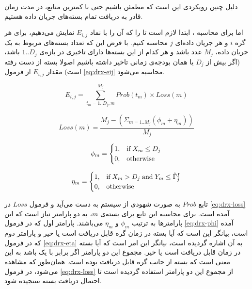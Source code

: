 \par
دلیل چنین رویکردی این است که مطمئن باشیم حتی با کمترین منابع، در مدت زمان  قادر به دریافت تمام بسته‌های جریان داده هستیم.

\par
اما برای محاسبه ، ابتدا لازم است تا  را که آن را با نماد $E_{i, j}$ نمایش می‌دهیم، برای هر گره $i$ و هر جریان داده‌ای $j$ محاسبه کنیم. با فرض این که تعداد بسته‌های مربوط به یک جریان داده، $M_j$ عدد باشد و هر کدام از این بسته‌ها دارای تاخیری در بازه‌ی $1..D_j$ باشد، (اگر بیش از $D_j$ یا همان بودجه‌ی زمانی تاخیر داشته باشیم اصولا بسته از دست رفته است) مقدار $E_{i, j}$ از فرمول \ref{eq:drx-eij} محاسبه می‌شود.

\begin{equation}
E_{i, j} = \sum^{M_j}_{t_m = 1..D_j, m} Prob(t_m) \times Loss(m)
\label{eq:drx-eij}
\end{equation}

\begin{equation}
Loss(m) = \frac{M_j - \left(\Sigma_{m = 1..M_j}(\phi_m + \eta_m)\right)}{M_j}
\label{eq:drx-loss}
\end{equation}

\begin{equation}
\phi_m = 
\begin{cases}
	1, &$if$ \; X_m \leq D_j\\
	0, &$otherwise$
\end{cases}
\label{eq:drx-phi}
\end{equation}

\begin{equation}
\eta_m = 
\begin{cases}
	1, &$if$ \; X_m > D_j \; $and$ \; Y_m \leq \hat{\Gamma}^I_j \\
	0, &$otherwise$
\end{cases}
\label{eq:drx-eta}
\end{equation}

\par
تابع $Prob$ به صورت شهودی از سیستم به دست می‌آید و فرمول $Loss$ در \ref{eq:drx-loss} آمده است. برای محاسبه این تابع برای بسته‌ی $m$، به دو پارامتر نیاز است که این پارامترها به ترتیب $\phi_m$ و $\eta_m$ می‌باشند. پارامتر اول که در فرمول \ref{eq:drx-phi} آمده است، بیانگر این است که آیا بسته در زمان  گره قابل دریافت است یا خیر و پارامتر دوم که در فرمول \ref{eq:drx-eta} به آن اشاره گردیده است، بیانگر این امر است که آیا بسته در زمان   قابل دریافت است یا خیر. مجموع این دو پارامتر اگر برابر با یک باشد به این معنی است که بسته از جانب گره قابل دریافت بوده است.  همان‌طور که مشاهده می‌شود، در فرمول \ref{eq:drx-loss} از مجموع این دو پارامتر استفاده گردیده است تا احتمال دریافت بسته سنجیده شود.


